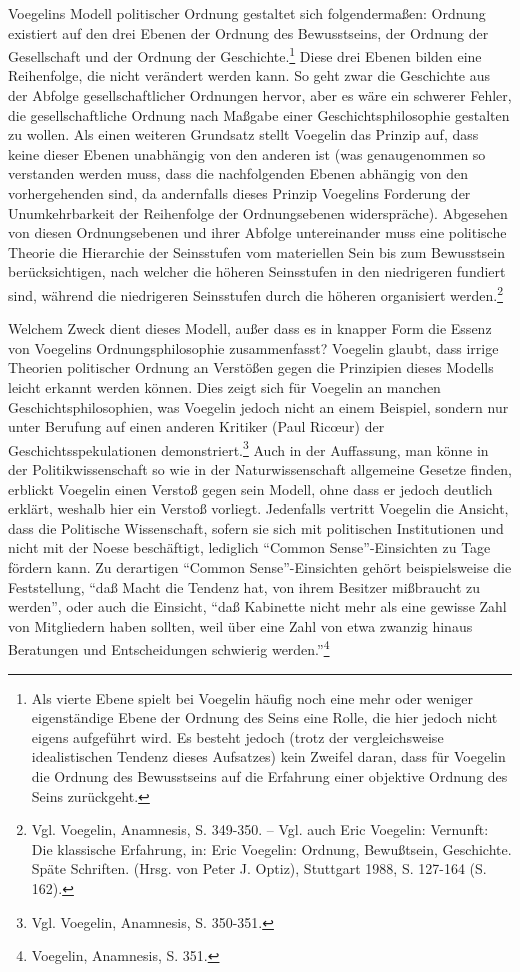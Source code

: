 Voegelins Modell politischer Ordnung gestaltet sich folgendermaßen: Ordnung
existiert auf den drei Ebenen der Ordnung des Bewusstseins, der Ordnung der
Gesellschaft und der Ordnung der Geschichte.\footnote{Als vierte Ebene spielt
  bei Voegelin häufig noch eine mehr oder weniger eigenständige Ebene der
  Ordnung des Seins eine Rolle, die hier jedoch nicht eigens aufgeführt wird.
  Es besteht jedoch (trotz der vergleichsweise idealistischen Tendenz dieses
  Aufsatzes) kein Zweifel daran, dass für Voegelin die Ordnung des
  Bewusstseins auf die Erfahrung einer objektive Ordnung des Seins
  zurückgeht.} Diese drei Ebenen bilden eine Reihenfolge, die nicht verändert
werden kann. So geht zwar die Geschichte aus der Abfolge gesellschaftlicher
Ordnungen hervor, aber es wäre ein schwerer Fehler, die gesellschaftliche
Ordnung nach Maßgabe einer Geschichtsphilosophie gestalten zu wollen. Als
einen weiteren Grundsatz stellt Voegelin das Prinzip auf, dass keine dieser
Ebenen unabhängig von den anderen ist (was genaugenommen so verstanden werden
muss, dass die nachfolgenden Ebenen abhängig von den vorhergehenden sind, da
andernfalls dieses Prinzip Voegelins Forderung der Unumkehrbarkeit
der Reihenfolge der Ordnungsebenen widerspräche). Abgesehen von diesen
Ordnungsebenen und ihrer Abfolge untereinander muss eine politische Theorie
die Hierarchie der Seinsstufen vom materiellen Sein bis zum Bewusstsein
berücksichtigen, nach welcher die höheren Seinsstufen in den niedrigeren
fundiert sind, während die niedrigeren Seinsstufen durch die höheren
organisiert werden.\footnote{Vgl.  Voegelin, Anamnesis, S. 349-350. -- Vgl.
  auch Eric Voegelin: Vernunft: Die klassische Erfahrung, in: Eric Voegelin:
  Ordnung, Bewußtsein, Geschichte.  Späte Schriften.  (Hrsg. von Peter J.
  Optiz), Stuttgart 1988, S. 127-164 (S. 162).}

Welchem Zweck dient dieses Modell, außer dass es in knapper Form die Essenz
von Voegelins Ordnungsphilosophie zusammenfasst? Voegelin glaubt, dass irrige
Theorien politischer Ordnung an Verstößen gegen die Prinzipien dieses Modells
leicht erkannt werden können. Dies zeigt sich für Voegelin an manchen
Geschichtsphilosophien, was Voegelin jedoch nicht an einem Beispiel, sondern
nur unter Berufung auf einen anderen Kritiker (Paul Ric\oe ur) der
Geschichtsspekulationen demonstriert.\footnote{Vgl. Voegelin, Anamnesis, S.
  350-351.} Auch in der Auffassung, man könne in der Politikwissenschaft so
wie in der Naturwissenschaft allgemeine Gesetze finden, erblickt Voegelin
einen Verstoß gegen sein Modell, ohne dass er jedoch deutlich erklärt, weshalb
hier ein Verstoß vorliegt. Jedenfalls vertritt Voegelin die Ansicht, dass die
Politische Wissenschaft, sofern sie sich mit politischen Institutionen und
nicht mit der Noese beschäftigt, lediglich "`Common Sense"'-Einsichten zu Tage
fördern kann. Zu derartigen "`Common Sense"'-Einsichten gehört beispielsweise
die Feststellung, "`daß Macht die Tendenz hat, von ihrem Besitzer mißbraucht
zu werden"', oder auch die Einsicht, "`daß Kabinette nicht mehr als eine
gewisse Zahl von Mitgliedern haben sollten, weil über eine Zahl von etwa
zwanzig hinaus Beratungen und Entscheidungen schwierig
werden."'\footnote{Voegelin, Anamnesis, S. 351.}

